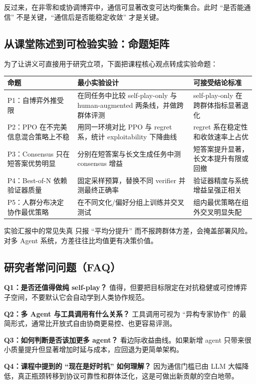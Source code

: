 \documentclass[a4paper]{article}
\begin{document}
反过来，在非零和或协调博弈中，通信可显著改变可达均衡集合。此时 ``是否能通信'' 不是关键，``通信后是否能稳定收敛'' 才是关键。

\subsection{从课堂陈述到可检验实验：命题矩阵}
为了让讲义可直接用于研究立项，下面把课程核心观点转成实验命题：

\begin{longtable}{p{3.0cm}p{4.6cm}p{4.9cm}}
\toprule
\textbf{命题} & \textbf{最小实验设计} & \textbf{可接受结论标准} \\
\midrule
P1：自博弈外推受限 & 在同任务中比较 self-play-only 与 human-augmented 两条线，并做跨群体评测 & self-play-only 在跨群体指标显著退化 \\
P2：PPO 在不完美信息混合策略上不稳 & 用同一环境对比 PPO 与 regret 系，统计 exploitability 下降曲线 & regret 系在稳定性和收敛速率上占优 \\
P3：Consensus 只在短答案优势明显 & 分别在短答案与长文生成任务中测 consensus 增益 & 短答案提升显著，长文本提升有限或回撤 \\
P4：Best-of-N 依赖验证器质量 & 固定采样预算，替换不同 verifier 并测最终正确率 & 验证器精度与系统增益呈强正相关 \\
P5：人群分布决定协作最优策略 & 在不同文化/偏好分组上训练并交叉测试 & 组内最优策略在组外交叉明显失配 \\
\bottomrule
\end{longtable}

\begin{warningbox}{实验汇报中的常见失真}
只报 ``平均分提升'' 而不报跨群体方差，会掩盖部署风险。对多 Agent 系统，方差往往比均值更有决策价值。
\end{warningbox}

\subsection{研究者常问问题（FAQ）}
\textbf{Q1：是否还值得做纯 self-play？}
值得，但要把目标限定在对抗稳健或可控博弈子空间，不要默认它会自动学到人类协作规范。

\textbf{Q2：多 Agent 与工具调用有什么关系？}
工具调用可视为 ``异构专家协作'' 的最简形式，通常比开放式自由协商更易控、也更容易评测。

\textbf{Q3：如何判断是否该加更多 agent？}
看边际收益曲线。如果新增 agent 只带来很小质量提升但显著增加时延与成本，应回退为更简单架构。

\textbf{Q4：课程中提到的 ``现在是好时机'' 如何理解？}
因为通信门槛已由 LLM 大幅降低，真正瓶颈转移到协议可靠性和群体泛化，这是可做出新贡献的空白地带。
\end{document}
